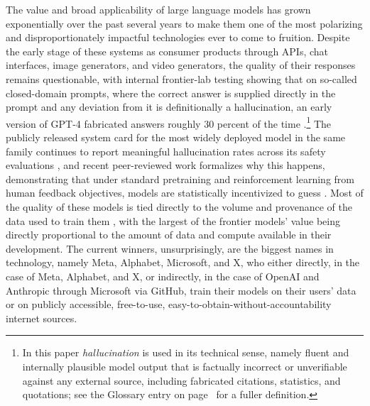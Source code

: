 \documentclass[10pt,a4paper,twocolumn]{article}
\begin{document}
The value and broad applicability of large language models has grown exponentially over the past several years to make them one of the most polarizing and disproportionately impactful technologies ever to come to fruition. Despite the early stage of these systems as consumer products through APIs, chat interfaces, image generators, and video generators, the quality of their responses remains questionable, with internal frontier-lab testing showing that on so-called closed-domain prompts, where the correct answer is supplied directly in the prompt and any deviation from it is definitionally a hallucination, an early version of GPT-4 fabricated answers roughly 30 percent of the time \citep[ch.~11]{hao2025empire}.\footnote{In this paper \emph{hallucination} is used in its technical sense, namely fluent and internally plausible model output that is factually incorrect or unverifiable against any external source, including fabricated citations, statistics, and quotations; see the Glossary entry on page~\pageref{sec:appendix-glossary} for a fuller definition.} The publicly released system card for the most widely deployed model in the same family continues to report meaningful hallucination rates across its safety evaluations \citep{openai2024gpt4osystemcard}, and recent peer-reviewed work formalizes why this happens, demonstrating that under standard pretraining and reinforcement learning from human feedback objectives, models are statistically incentivized to guess \citep{kalai2025whyhallucinate}. Most of the quality of these models is tied directly to the volume and provenance of the data used to train them \citep{kaplan2020scaling}, with the largest of the frontier models' value being directly proportional to the amount of data and compute available in their development. The current winners, unsurprisingly, are the biggest names in technology, namely Meta, Alphabet, Microsoft, and X, who either directly, in the case of Meta, Alphabet, and X, or indirectly, in the case of OpenAI and Anthropic through Microsoft via GitHub, train their models on their users' data or on publicly accessible, free-to-use, easy-to-obtain-without-accountability internet sources.
\end{document}
